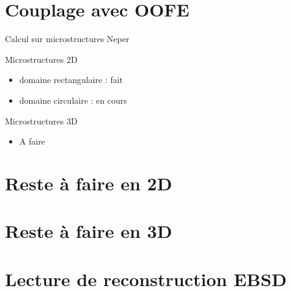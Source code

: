 \documentclass[11pt,aspectratio=1610]{beamer}
\begin{document}
\section{Couplage avec OOFE}
\begin{frame}{Calcul sur microstructures Neper}
  \begin{block}{Microstructures 2D}
    \begin{itemize}
    \item domaine rectangulaire : fait
    \item domaine circulaire : en cours
    \end{itemize}
  \end{block}
  \begin{block}{Microstructures 3D}
    \begin{itemize}
    \item[] A faire 
    \end{itemize}
  \end{block}
\end{frame}

\section{}



\section{Reste à faire en 2D}

\section{Reste à faire en 3D}

\section{Lecture de reconstruction EBSD}
\end{document}
